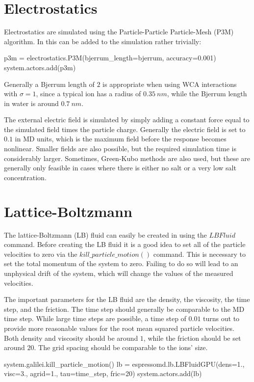 \documentclass[
paper=a4,                       %
fontsize=11pt,                  %
twoside,                        %
footsepline,                    %
headsepline,                    %
headinclude=false,              %
footinclude=false,              %
pagesize,                       %
]{scrartcl}
\begin{document}
\section{Electrostatics}
Electrostatics are simulated using the Particle-Particle Particle-Mesh (P3M) algorithm. In \es{} this can be added to the simulation rather trivially:
{\small\vspace{0,2cm}
\begin{pypresso}[numbers=none]
p3m = electrostatics.P3M(bjerrum_length=bjerrum, accuracy=0.001)
system.actors.add(p3m)
\end{pypresso}
}
Generally a Bjerrum length of $2$ is appropriate when using WCA interactions with $\sigma=1$, since a typical ion has a radius of $\SI{0.35}{nm}$, while the Bjerrum
length in water is around $\SI{0.7}{nm}$.

The external electric field is simulated by simply adding a constant force equal to the simulated field times the particle charge. Generally the electric field is set to $0.1$ in MD units,
which is the maximum field before the response becomes nonlinear. Smaller fields are also possible, but the required simulation time is considerably larger. Sometimes, Green-Kubo methods
are also used, but these are generally only feasible in cases where there is either no salt or a very low salt concentration.

\section{Lattice-Boltzmann}
The lattice-Boltzmann (LB) fluid can easily be created in \es{} using the $LBFluid$ command.
Before creating the LB fluid it is a good idea to set all of the particle velocities to zero via the $kill\_particle\_motion()$ command.
This is necessary to set the total momentum of the system to zero. Failing to do so will lead to an unphysical drift of the system, which
will change the values of the measured velocities.

The important parameters for the LB fluid are the density, the viscosity, the time step, and the friction. The time step should generally be comparable to the MD time step. While
large time steps are possible, a time step of $0.01$ turns out to provide more reasonable values for the root mean squared particle velocities. Both density and viscosity
should be around $1$, while the friction should be set around $20.$ The grid spacing should be comparable to the ions' size.
{\small\vspace{0,2cm}
\begin{pypresso}[numbers=none]
system.galilei.kill_particle_motion()
lb = espressomd.lb.LBFluidGPU(dens=1., visc=3., agrid=1., tau=time_step, fric=20)
system.actors.add(lb)
\end{pypresso}
}
\end{document}
